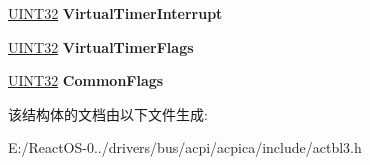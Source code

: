 \begin{DoxyCompactItemize}
\hyperlink{_processor_bind_8h_ae1e6edbbc26d6fbc71a90190d0266018}{U\+I\+N\+T32} {\bfseries Virtual\+Timer\+Interrupt}
\item 
\mbox{\label{structacpi__gtdt__timer__entry_a7f57cefac77e2948f36677279fd77a11}} 
\hyperlink{_processor_bind_8h_ae1e6edbbc26d6fbc71a90190d0266018}{U\+I\+N\+T32} {\bfseries Virtual\+Timer\+Flags}
\item 
\mbox{\label{structacpi__gtdt__timer__entry_a7f496502f792ba156476d72c84a9c882}} 
\hyperlink{_processor_bind_8h_ae1e6edbbc26d6fbc71a90190d0266018}{U\+I\+N\+T32} {\bfseries Common\+Flags}
\end{DoxyCompactItemize}


该结构体的文档由以下文件生成\+:\begin{DoxyCompactItemize}
\item 
E\+:/\+React\+O\+S-\/0../drivers/bus/acpi/acpica/include/actbl3.\+h\end{DoxyCompactItemize}

